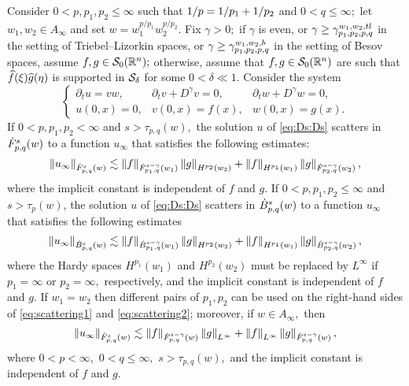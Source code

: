 { 
 \begin{theorem}\label{thm:scattering} Consider  $0 < p, p_1, p_2  \le \infty$  such that $\hcline$ and  $0 < q \leq \infty;$ let  $w_1,w_2\in A_\infty$ and set $w=w_1^{{p}/{p_1}} w_2^{{p}/{p_2}}.$ 
Fix $\gamma>0;$ if $\gamma$ is even, or $\gamma\ge \gamt$ in the setting of Triebel--Lizorkin spaces, or $\gamma\ge \gamb$ in the setting of Besov spaces, assume $f, g \in \swz;$ otherwise, assume that $f,g\in\swz$ are such that $\fhat(\xi)\ghat(\eta)$ is supported in $\Ss_{\delta}$ for some $0<\delta\ll1.$ Consider the system 
\begin{equation}\label{eq:Ds:Ds}
\left\{ \begin{array}{lll}  \partial_t u =vw, & \partial_t v +D^\gamma v = 0, & \partial_t w + D^\gamma w = 0, \\
  u(0,x)=0,&v(0,x)=f(x),&w(0,x) = g(x).
 \end{array} \right.
\end{equation}
If $0 < p,p_1,p_2 < \infty$ and  $s > \tau_{p,q}(w),$ the solution $u$ of \eqref{eq:Ds:Ds}  scatters in $\tlw{p}{s}{q}{w}$ to a function $u_\infty$ that satisfies the following estimates: 
\begin{equation}\label{eq:scattering1}
\norm{u_\infty}{\tlw{p}{s}{q}{w}} \lesssim \norm{f}{\tlw{p_1}{s-\gamma}{q}{w_1} } \norm{g}{H^{p_2}(w_2)} +  \norm{f}{H^{p_1}(w_1)}   \norm{g}{\tlw{p_2}{s-\gamma}{q}{w_2} },
\end{equation}
where the implicit constant is independent of $f$ and $g.$
If $0< p, p_1,p_2\leq \infty$ and $s > \tau_p(w)$, the solution $u$ of \eqref{eq:Ds:Ds}  scatters in $\besw{p}{s}{q}{w}$ to a function $u_\infty$ that satisfies the following estimates
\begin{equation}\label{eq:scattering2}
\norm{u_\infty}{\besw{p}{s}{q}{w}} \lesssim \norm{f}{\besw{p_1}{s-\gamma}{q}{w_1} } \norm{g}{H^{p_2}(w_2)} +  \norm{f}{H^{p_1}(w_1)}   \norm{g}{\besw{p_2}{s-\gamma}{q}{w_2} },
\end{equation}
where the Hardy spaces $H^{p_1}(w_1)$ and $H^{p_2}(w_2)$ must be replaced by $L^\infty$ if $p_1=\infty$ or $p_2=\infty,$ respectively, and the implicit constant is independent of $f$ and $g.$ 
If $w_1=w_2$ then different pairs of $p_1, p_2$ can be used on the right-hand sides of \eqref{eq:scattering1} and \eqref{eq:scattering2}; moreover, if $w\in A_\infty,$ then 
\begin{equation*}
\norm{u_\infty}{\tlw{p}{s}{q}{w}} \lesssim \norm{f}{\tlw{p}{s-\gamma}{q}{w} } \norm{g}{L^\infty} +  \norm{f}{L^\infty}   \norm{g}{\tlw{p}{s-\gamma}{q}{w}},
\end{equation*}
where $0<p<\infty,$ $0<q\le\infty,$  $s>\tau_{p,q}(w),$ and the implicit constant is independent of $f$ and $g.$ 
\end{theorem} 


}
